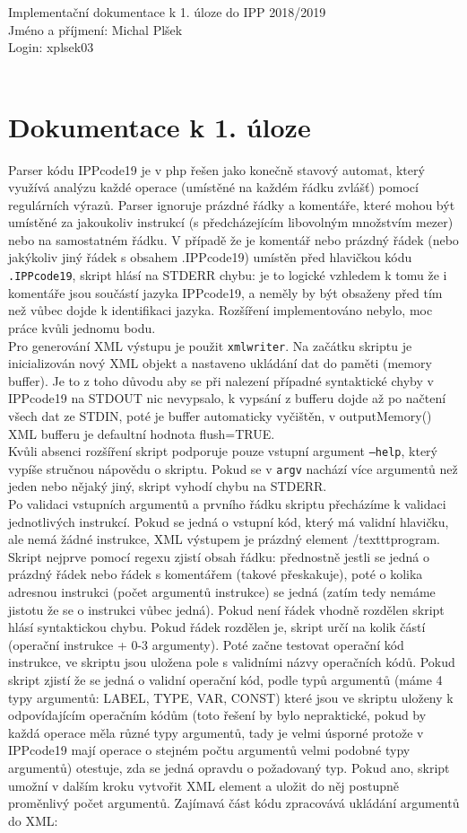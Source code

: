 \documentclass[10pt]{article}
\begin{document}
\noindent
Implementační dokumentace k 1. úloze do IPP 2018/2019
\\
Jméno a příjmení: Michal Plšek\\
Login: xplsek03\\\\
\section*{Dokumentace k 1. úloze}
Parser kódu IPPcode19 je v php řešen jako konečně stavový automat, který využívá analýzu každé operace (umístěné na každém řádku zvlášť) pomocí regulárních výrazů. Parser ignoruje prázdné řádky a komentáře, které mohou být umístěné za jakoukoliv instrukcí (s předcházejícím libovolným množstvím mezer) nebo na samostatném řádku. V případě že je komentář nebo prázdný řádek (nebo jakýkoliv jiný řádek s obsahem .IPPcode19) umístěn před hlavičkou kódu \texttt{.IPPcode19}, skript hlásí na STDERR chybu: je to logické vzhledem k tomu že i komentáře jsou součástí jazyka IPPcode19, a neměly by být obsaženy před tím než vůbec dojde k identifikaci jazyka. Rozšíření implementováno nebylo, moc práce kvůli jednomu bodu.\\
Pro generování XML výstupu je použit \texttt{xmlwriter}. Na začátku skriptu je inicializován nový XML objekt a nastaveno ukládání dat do paměti (memory buffer). Je to z toho důvodu aby se při nalezení případné syntaktické chyby v IPPcode19 na STDOUT nic nevypsalo, k vypsání z bufferu dojde až po načtení všech dat ze STDIN, poté je buffer automaticky vyčištěn, v outputMemory() XML bufferu je defaultní hodnota flush=TRUE.\\
Kvůli absenci rozšíření skript podporuje pouze vstupní argument \texttt{--help}, který vypíše stručnou nápovědu o skriptu. Pokud se v \texttt{argv} nachází více argumentů než jeden nebo nějaký jiný, skript vyhodí chybu na STDERR.\\
Po validaci vstupních argumentů a prvního řádku skriptu přecházíme k validaci jednotlivých instrukcí. Pokud se jedná o vstupní kód, který má validní hlavičku, ale nemá žádné instrukce, XML výstupem je prázdný element /texttt{program}. Skript nejprve pomocí regexu zjistí obsah řádku: přednostně jestli se jedná o prázdný řádek nebo řádek s komentářem (takové přeskakuje), poté o kolika adresnou instrukci (počet argumentů instrukce) se jedná (zatím tedy nemáme jistotu že se o instrukci vůbec jedná). Pokud není řádek vhodně rozdělen skript hlásí syntaktickou chybu. Pokud řádek rozdělen je, skript určí na kolik částí (operační instrukce + 0-3 argumenty). Poté začne testovat operační kód instrukce, ve skriptu jsou uložena pole s validními názvy operačních kódů. Pokud skript zjistí že se jedná o validní operační kód, podle typů argumentů (máme 4 typy argumentů: LABEL, TYPE, VAR, CONST) které jsou ve skriptu uloženy k odpovídajícím operačním kódům (toto řešení by bylo nepraktické, pokud by každá operace měla různé typy argumentů, tady je velmi úsporné protože v IPPcode19 mají operace o stejném počtu argumentů velmi podobné typy argumentů) otestuje, zda se jedná opravdu o požadovaný typ. Pokud ano, skript umožní v dalším kroku vytvořit XML element a uložit do něj postupně proměnlivý počet argumentů. Zajímavá část kódu zpracovává ukládání argumentů do XML:\\
\end{document}
